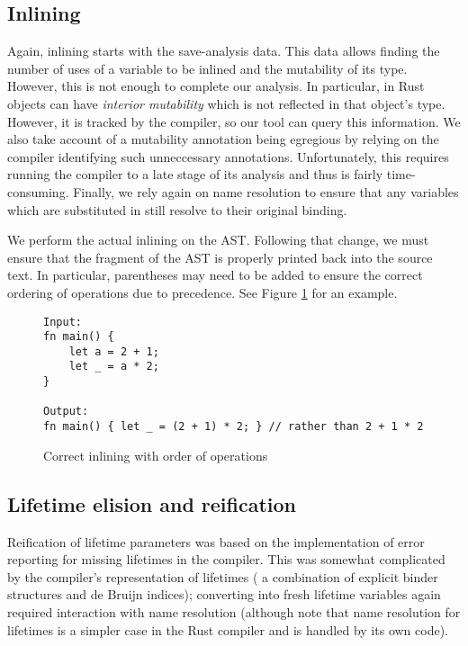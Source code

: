 \subsection{Inlining}

Again, inlining starts with the save-analysis data. This data allows finding the number of uses of a variable to be inlined and the mutability of its type. However, this is not enough to complete our analysis. In particular, in Rust objects can have \textit{interior mutability} which is not reflected in that object's type. However, it is tracked by the compiler, so our tool can query this information. We also take account of a mutability annotation being egregious by relying on the compiler identifying such unneccessary annotations. Unfortunately, this requires running the compiler to a late stage of its analysis and thus is fairly time-consuming. Finally, we rely again on name resolution to ensure that any variables which are substituted in still resolve to their original binding.

We perform the actual inlining on the AST. Following that change, we must ensure that the fragment of the AST is properly printed back into the source text. In particular, parentheses may need to be added to ensure the correct ordering of operations due to precedence. See Figure \ref{Fig:exinline} for an example.

\begin{figure}[h]
\centering
\begin{verbatim}
Input:
fn main() {
    let a = 2 + 1;
    let _ = a * 2;
}

Output:
fn main() { let _ = (2 + 1) * 2; } // rather than 2 + 1 * 2
\end{verbatim}
\caption{Correct inlining with order of operations}
\label{Fig:exinline}
\end{figure}

\subsection{Lifetime elision and reification}

Reification of lifetime parameters was based on the implementation of error reporting for missing lifetimes in the compiler. This was somewhat complicated by the compiler's representation of lifetimes ( a combination of explicit binder structures and de Bruijn indices); converting into fresh lifetime variables again required interaction with name resolution (although note that name resolution for lifetimes is a simpler case in the Rust compiler and is handled by its own code).

